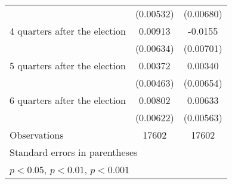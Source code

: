 \begin{table}[htbp]
\begin{tabular}{l*{2}{c}}
                    &   (0.00532)         &   (0.00680)         \\
[1em]
 4 quarters after the election&     0.00913         &     -0.0155\sym{*}  \\
                    &   (0.00634)         &   (0.00701)         \\
[1em]
 5 quarters after the election&     0.00372         &     0.00340         \\
                    &   (0.00463)         &   (0.00654)         \\
[1em]
 6 quarters after the election&     0.00802         &     0.00633         \\
                    &   (0.00622)         &   (0.00563)         \\
\hline
Observations        &       17602         &       17602         \\
\hline\hline
\multicolumn{3}{l}{\footnotesize Standard errors in parentheses}\\
\multicolumn{3}{l}{\footnotesize \sym{*} \(p<0.05\), \sym{**} \(p<0.01\), \sym{***} \(p<0.001\)}\\
\end{tabular}
\end{table}
